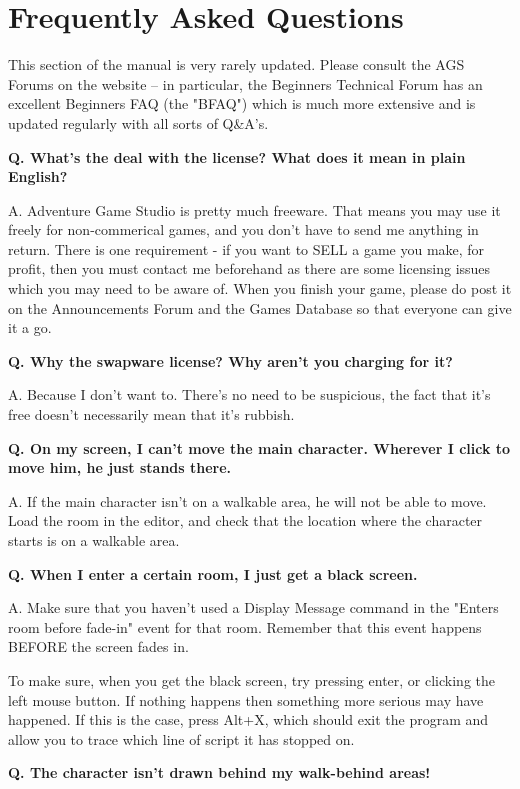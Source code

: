 \chapter{Frequently Asked Questions}%

This section of the manual is very rarely updated. Please consult
the AGS Forums on the website -- in particular, the Beginners Technical
Forum has an excellent Beginners FAQ (the "BFAQ") which is much more
extensive and is updated regularly with all sorts of Q&A's.

\bf{Q. What's the deal with the license? What does it mean in plain English?}

A. Adventure Game Studio is pretty much freeware. That means you may use
   it freely for non-commerical games, and you don't have to send me anything
   in return.
   There is one requirement - if you want to SELL a game you make, for profit,
   then you must contact me beforehand as there are some licensing issues
   which you may need to be aware of.
   When you finish your game, please do post it on the Announcements
   Forum and the Games Database so that everyone can give it a go.

\bf{Q. Why the swapware license? Why aren't you charging for it?}

A. Because I don't want to. There's no need to be suspicious, the fact that it's
   free doesn't necessarily mean that it's rubbish.

\bf{Q. On my screen, I can't move the main character. Wherever I click to move him,
   he just stands there.}

A. If the main character isn't on a walkable area, he will not be able to move.
   Load the room in the editor, and check that the location where the
   character starts is on a walkable area.

\bf{Q. When I enter a certain room, I just get a black screen.}

A. Make sure that you haven't used a Display Message command in the "Enters
   room before fade-in" event for that room. Remember that this event happens BEFORE
   the screen fades in.

   To make sure, when you get the black screen, try pressing enter, or clicking
   the left mouse button. If nothing happens then something more serious may
   have happened. If this is the case, press Alt+X, which should exit the
   program and allow you to trace which line of script it has stopped on.

\bf{Q. The character isn't drawn behind my walk-behind areas!}

